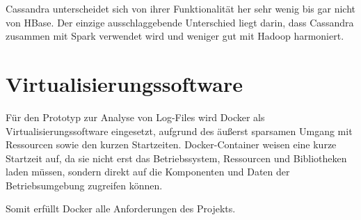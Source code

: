 Cassandra unterscheidet sich von ihrer Funktionalität her sehr wenig bis gar nicht von HBase. Der einzige ausschlaggebende Unterschied liegt darin, dass Cassandra zusammen mit Spark verwendet wird und weniger gut mit Hadoop harmoniert.

\section{Virtualisierungssoftware}
\label{sec:virtsoft}

Für den Prototyp zur Analyse von Log-Files wird Docker als Virtualisierungssoftware eingesetzt, aufgrund des äußerst sparsamen Umgang mit Ressourcen sowie den kurzen Startzeiten. Docker-Container weisen eine kurze Startzeit auf, da sie nicht erst das Betriebssystem, Ressourcen und Bibliotheken laden müssen, sondern direkt auf die Komponenten und Daten der Betriebsumgebung zugreifen können. 

Somit erfüllt Docker alle Anforderungen des Projekts.